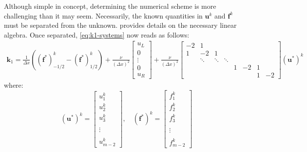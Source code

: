 Although simple in concept, determining the numerical scheme is more challenging than it may seem.
Necessarily, the known quantities in $\mathbf{u}^k$ and $\mathbf{f}^k$ must be separated from the unknown.
 provides details on the necessary linear algebra.
Once separated, \cref{eq:k1-systems} now reads as follows:
\begin{equation}
    \label{eq:final-k1Dirichlet-system}
    \begin{split}
        \mathbf{k}_1=\frac{1}{\Delta x}\left( \left( \mathbf{f}^*\right)^k_{-1/2}-\left( \mathbf{f}^*\right)^k_{1/2} \right)+\frac{\nu }{\left( \Delta x \right)^2}
        \begin{bmatrix}
            u_L    \\
            0      \\
            \vdots \\
            0      \\
            u_R
        \end{bmatrix}
        +\frac{\nu }{\left( \Delta x \right)^2}
        \begin{bmatrix}
            -2 & 1 & & & & & \\
            1 & -2 & 1 & & & & \\
            & \ddots & \ddots & \ddots & & & \\
            & & & & 1 & -2 & 1 \\
            & & & & & & 1 & -2
        \end{bmatrix}\left( \mathbf{u}^* \right)^k
    \end{split}
\end{equation}
where:
\begin{equation}
    \label{eq:u_vec_star-and-f_vec_star-definition}
    \left(\mathbf{u}^*\right)^k = \begin{bmatrix}
                                      u_1^k  \\
                                      u_2^k  \\
                                      u_3^k  \\
                                      \\
                                      \vdots\\\\
                                      u_{m-2}^k
    \end{bmatrix},\quad
    \left(\mathbf{f}^*\right)^k = \begin{bmatrix}
                                      f_1^k  \\
                                      f_2^k  \\
                                      f_3^k  \\
                                      \\
                                      \vdots\\\\
                                      f_{m-2}^k
    \end{bmatrix}
\end{equation}
